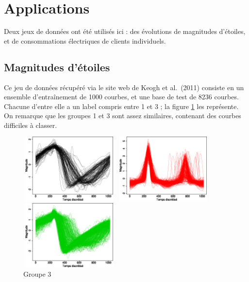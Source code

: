 \documentclass[12pt]{article}
\begin{document}
\section{Applications}

Deux jeux de données ont été utilisés ici : des évolutions de magnitudes d'étoiles, et de consommations électriques de clients individuels.

\subsection{Magnitudes d'étoiles}

Ce jeu de données récupéré via le site web de Keogh et al.~(2011) consiste en un ensemble d'entraînement de 1000 courbes, 
et une base de test de 8236 courbes. Chacune d'entre elle a un label compris entre 1 et 3 ; la figure \ref{figsltr3clusts} les représente. 
On remarque que les groupes 1 et 3 sont assez similaires, contenant des courbes difficiles à classer.

\begin{figure}[H]
\begin{minipage}[c]{.32\linewidth}
	\includegraphics[width=5cm,height=3.5cm]{img/slgr1.png}
	\vspace*{-0.3cm}
	\caption{Groupe 1}
\end{minipage}
\begin{minipage}[c]{.32\linewidth}
	\includegraphics[width=5cm,height=3.5cm]{img/slgr2.png}
	\vspace*{-0.3cm}
	\caption{Groupe 2}
\end{minipage}
\begin{minipage}[c]{.32\linewidth}
	\includegraphics[width=5cm,height=3.5cm]{img/slgr3.png}
	\vspace*{-0.3cm}
	\caption{Groupe 3}
\end{minipage}
\label{figsltr3clusts}
\end{figure}
\end{document}
